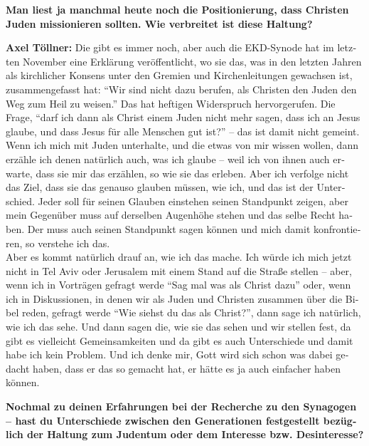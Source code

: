 \begin{otherlanguage}{ngerman}
\textbf{Man liest ja manchmal heute noch die Positionierung, dass Christen Juden missionieren sollten. Wie verbreitet ist diese Haltung?} 

\textbf{Axel Töllner:} Die gibt es immer noch, aber auch die EKD-Synode hat im letzten November eine Erklärung veröffentlicht, wo sie das, was in den letzten Jahren als kirchlicher Konsens unter den Gremien und Kirchenleitungen gewachsen ist, zusammengefasst hat: "`Wir sind nicht dazu berufen, als Christen den Juden den Weg zum Heil zu weisen."' Das hat heftigen Widerspruch hervorgerufen. Die Frage, "`darf ich dann als Christ einem Juden nicht mehr sagen, dass ich an Jesus glaube, und dass Jesus für alle Menschen gut ist?"' – das ist damit nicht gemeint. Wenn ich mich mit Juden unterhalte, und die etwas von mir wissen wollen, dann erzähle ich denen natürlich auch, was ich glaube – weil ich von ihnen auch erwarte, dass sie mir das erzählen, so wie sie das erleben. Aber ich verfolge nicht das Ziel, dass sie das genauso glauben müssen, wie ich, und das ist der Unterschied. Jeder soll für seinen Glauben einstehen seinen Standpunkt zeigen, aber mein Gegenüber muss auf derselben Augenhöhe stehen und das selbe Recht haben. Der muss auch seinen Standpunkt sagen können und mich damit konfrontieren, so verstehe ich das. \\ 
Aber es kommt natürlich drauf an, wie ich das mache. Ich würde ich mich jetzt nicht in Tel Aviv oder Jerusalem mit einem Stand auf die Straße stellen – aber, wenn ich in Vorträgen gefragt werde "`Sag mal was als Christ dazu"' oder, wenn ich in Diskussionen, in denen wir als Juden und Christen zusammen über die Bibel reden, gefragt werde "`Wie siehst du das als Christ?"', dann sage ich natürlich, wie ich das sehe. Und dann sagen die, wie sie das sehen und wir stellen fest, da gibt es vielleicht Gemeinsamkeiten und da gibt es auch Unterschiede und damit habe ich kein Problem. Und ich denke mir, Gott wird sich schon was dabei gedacht haben, dass er das so gemacht hat, er hätte es ja auch einfacher haben können.  

\textbf{Nochmal zu deinen Erfahrungen bei der Recherche zu den Synagogen – hast du Unterschiede zwischen den Generationen festgestellt bezüglich der Haltung zum Judentum oder dem Interesse bzw. Desinteresse?} 
 

\end{otherlanguage}
